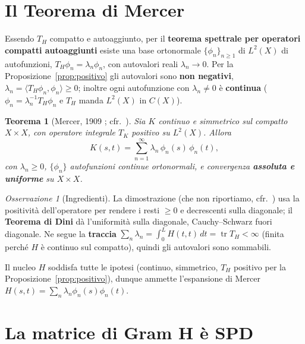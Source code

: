 \documentclass[11pt,a4paper]{article}
\theoremstyle{plain}
\newtheorem{teorema}{Teorema}
\theoremstyle{remark}
\newtheorem*{osservazione}{Osservazione}
\DeclareMathOperator{\tr}{tr}
\newcommand{\Hmat}{\mathbf{H}}
\newcommand{\Top}{T_{\!H}}
\newcommand{\inner}[2]{\langle #1, #2\rangle}
\begin{document}
\section{Il Teorema di Mercer}
\label{sec:mercer}

Essendo $\Top$ compatto e autoaggiunto, per il \textbf{teorema spettrale per operatori compatti
autoaggiunti} \cite{reedsimon1980,brezis2011} esiste una base ortonormale $\{\phi_n\}_{n\ge1}$ di
$L^2(X)$ di autofunzioni, $\Top\phi_n=\lambda_n\phi_n$, con autovalori reali $\lambda_n\to0$. Per
la Proposizione~\ref{prop:positivo} gli autovalori sono \textbf{non negativi},
$\lambda_n=\inner{\Top\phi_n}{\phi_n}\ge0$; inoltre ogni autofunzione con $\lambda_n\ne0$ \`e
\textbf{continua} ($\phi_n=\lambda_n^{-1}\Top\phi_n$ e $\Top$ manda $L^2(X)$ in $C(X)$).

\begin{teorema}[Mercer, 1909 \cite{mercer1909}; cfr.\ \cite{riesznagy1955,steinwart2008}]
\label{thm:mercer}
Sia $K$ continuo e simmetrico sul compatto $X\times X$, con operatore integrale $T_K$ positivo su
$L^2(X)$. Allora
\[
  K(s,t)=\sum_{n=1}^\infty \lambda_n\,\phi_n(s)\,\phi_n(t),
\]
con $\lambda_n\ge0$, $\{\phi_n\}$ autofunzioni continue ortonormali, e convergenza
\textbf{assoluta e uniforme} su $X\times X$.
\end{teorema}

\begin{osservazione}[Ingredienti]
La dimostrazione (che non riportiamo, cfr.\ \cite{riesznagy1955,steinwart2008}) usa la positivit\`a
dell'operatore per rendere i resti $\ge0$ e decrescenti sulla diagonale; il \textbf{Teorema di
Dini} d\`a l'uniformit\`a sulla diagonale, Cauchy--Schwarz fuori diagonale. Ne segue la
\textbf{traccia} $\sum_n\lambda_n=\int_0^L H(t,t)\,dt=\tr\Top<\infty$ (finita perch\'e $H$ \`e
continuo sul compatto), quindi gli autovalori sono sommabili.
\end{osservazione}

Il nucleo $H$ soddisfa tutte le ipotesi (continuo, simmetrico, $\Top$ positivo per la
Proposizione~\ref{prop:positivo}), dunque ammette l'espansione di Mercer
$H(s,t)=\sum_n\lambda_n\phi_n(s)\phi_n(t)$.

\section{La matrice di Gram \texorpdfstring{$\Hmat$}{H} \`e SPD}
\label{sec:spd}
\end{document}
